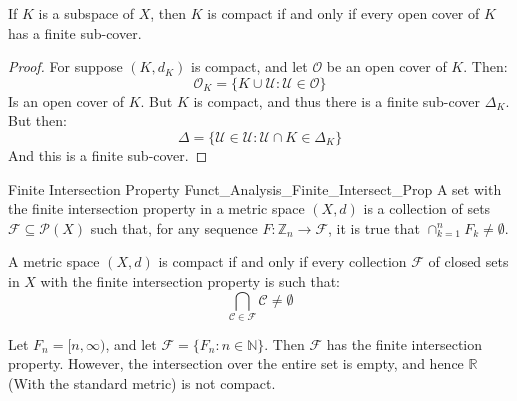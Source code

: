 \documentclass[crop=false,class=book,oneside]{standalone}                      %
\begin{document}
            \begin{theorem}
                If $K$ is a subspace of $X$, then $K$ is compact
                if and only if every open cover of $K$ has a
                finite sub-cover.
            \end{theorem}
            \begin{proof}
                For suppose $(K,d_{K})$ is compact, and let
                $\mathcal{O}$ be an open cover of $K$. Then:
                \begin{equation}
                    \mathcal{O}_{K}=\{K\cup\mathcal{U}:
                        \mathcal{U}\in\mathcal{O}\}
                \end{equation}
                Is an open cover of $K$. But $K$ is compact,
                and thus there is a finite sub-cover
                $\Delta_{K}$. But then:
                \begin{equation}
                    \Delta=\{\mathcal{U}\in\mathcal{U}:
                             \mathcal{U}\cap{K}\in\Delta_{K}\}
                \end{equation}
                And this is a finite sub-cover.
            \end{proof}
            \begin{ldefinition}{Finite Intersection Property}
                  {Funct_Analysis_Finite_Intersect_Prop}
                A set with the finite intersection property
                in a metric space $(X,d)$ is a collection of sets
                $\mathscr{F}\subseteq\mathcal{P}(X)$ such that,
                for any sequence
                $F:\mathbb{Z}_{n}\rightarrow\mathscr{F}$, 
                it is true that $\cap_{k=1}^{n}F_{k}\ne\emptyset$.
            \end{ldefinition}
            \begin{theorem}
                A metric space $(X,d)$ is compact if and only if
                every collection $\mathscr{F}$ of closed sets in
                $X$ with the
                finite intersection property is such that:
                \begin{equation}
                    \bigcap_{\mathcal{C}\in\mathcal{F}}
                        \mathcal{C}\ne\emptyset
                \end{equation}
            \end{theorem}
            \begin{lexample}
                Let $F_{n}=[n,\infty)$, and let
                $\mathscr{F}=\{F_{n}:n\in\mathbb{N}\}$.
                Then $\mathscr{F}$ has the finite intersection
                property. However, the intersection over the
                entire set is empty, and hence $\mathbb{R}$
                (With the standard metric) is not compact.
            \end{lexample}
\end{document}

